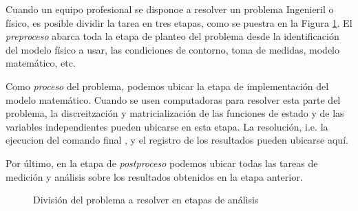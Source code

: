Cuando un equipo profesional se disponoe a resolver 
un problema Ingenieril o físico, es posible dividir la 
tarea en tres etapas, como se puestra en la Figura 
\ref{FiguraProbIngFis}.  
El \emph{preproceso} 
abarca toda la etapa de planteo del problema
desde la identificación del modelo físico a 
usar, las condiciones de contorno, toma de 
medidas, modelo matemático, etc. 

Como \emph{proceso} del problema, podemos ubicar
la etapa de implementación del modelo
matemático. Cuando se usen computadoras
para resolver esta parte del problema,
la discreitzación y matricialización de 
las funciones de estado y de las variables
independientes pueden ubicarse en esta 
etapa. La resolución, i.e. la ejecucion
del comando final , y el registro de los
resultados pueden ubicarse aquí.

Por último, en la etapa de 
\emph{postproceso} podemos ubicar todas
las tareas de medición y análisis sobre 
los resultados obtenidos en la etapa
anterior. 

 \begin{figure}
  \caption{División del problema a resolver en etapas de análisis \label{FiguraProbIngFis}}

\end{figure}


\mode*

